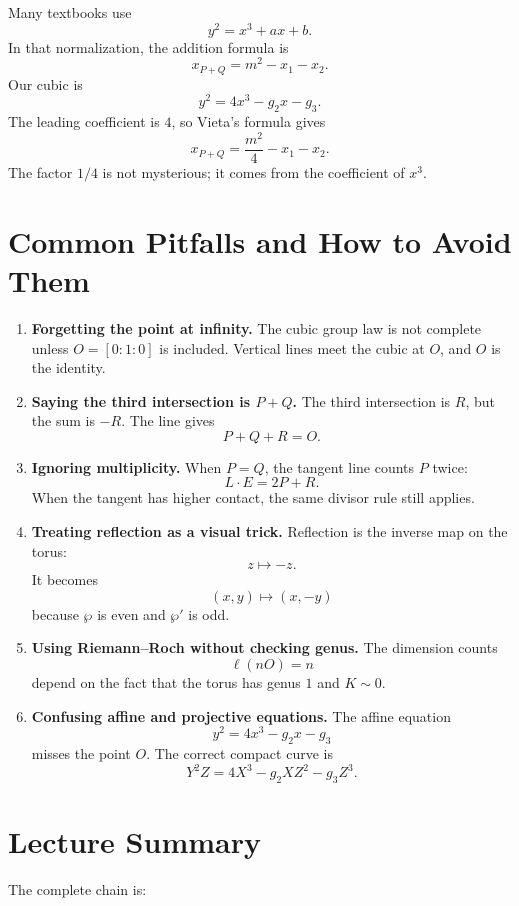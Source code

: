 \documentclass[11pt]{article}
\begin{document}
Many textbooks use
\[
y^2=x^3+ax+b.
\]
In that normalization, the addition formula is
\[
x_{P+Q}=m^2-x_1-x_2.
\]
Our cubic is
\[
y^2=4x^3-g_2x-g_3.
\]
The leading coefficient is \(4\), so Vieta's formula gives
\[
x_{P+Q}=\frac{m^2}{4}-x_1-x_2.
\]
The factor \(1/4\) is not mysterious; it comes from the coefficient of
\(x^3\).

\section{Common Pitfalls and How to Avoid Them}

\begin{enumerate}
\item \textbf{Forgetting the point at infinity.}
The cubic group law is not complete unless \(O=[0:1:0]\) is included.
Vertical lines meet the cubic at \(O\), and \(O\) is the identity.

\item \textbf{Saying the third intersection is \(P+Q\).}
The third intersection is \(R\), but the sum is \(-R\).  The line gives
\[
P+Q+R=O.
\]

\item \textbf{Ignoring multiplicity.}
When \(P=Q\), the tangent line counts \(P\) twice:
\[
L\cdot E=2P+R.
\]
When the tangent has higher contact, the same divisor rule still applies.

\item \textbf{Treating reflection as a visual trick.}
Reflection is the inverse map on the torus:
\[
z\mapsto -z.
\]
It becomes
\[
(x,y)\mapsto(x,-y)
\]
because \(\wp\) is even and \(\wp'\) is odd.

\item \textbf{Using Riemann--Roch without checking genus.}
The dimension counts
\[
\ell(nO)=n
\]
depend on the fact that the torus has genus \(1\) and \(K\sim0\).

\item \textbf{Confusing affine and projective equations.}
The affine equation
\[
y^2=4x^3-g_2x-g_3
\]
misses the point \(O\).  The correct compact curve is
\[
Y^2Z=4X^3-g_2XZ^2-g_3Z^3.
\]
\end{enumerate}

\section{Lecture Summary}

The complete chain is:
\end{document}
